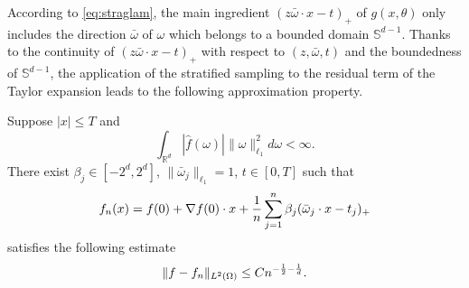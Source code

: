According to \eqref{eq:straglam}, the main ingredient $(z\bar \omega\cdot x - t)_+$ of $g(x,\theta)$  only includes the direction $\bar\omega$ of $\omega$ which belongs to a bounded domain  $\mathbb{S}^{d-1}$. Thanks to the continuity of $(z\bar \omega\cdot x - t)_+$ with respect to $(z, \bar\omega, t)$ and the boundedness of $\mathbb{S}^{d-1}$,
the application of the stratified sampling to the residual term of the Taylor expansion leads to the following approximation property.
\begin{theorem}\label{est:stratify}
Suppose $|x|\le T$ and 
$$
 \int_{\mathbb{R}^{d}} |\hat{f}(\omega)|\|\omega\|_{\ell_1}^{2} d\omega<\infty.
$$
There exist $\beta_j\in [-2^d,2^d]$, $\|\bar \omega_j\|_{\ell_1}=1$, $t\in [0,T]$ such that 
$$
f_n(x)= f(0) + \nabla  f(0) \cdot x  + {1\over n}\sum_{j=1}^{n}\beta_j (\bar \omega_j\cdot x - t_j)_+
$$ 
satisfies the following estimate 
\begin{equation}
\|f - f_n \|_{L^2(\Omega)} \leq C n^{-{1\over 2}-{1\over d}}.
\end{equation} 
\end{theorem}
